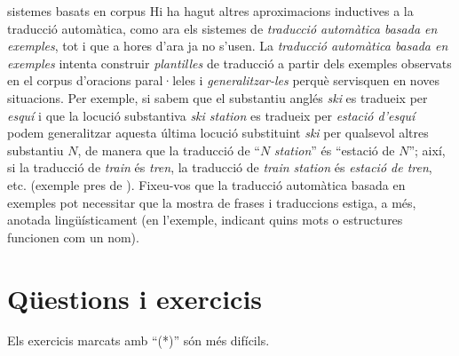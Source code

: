 \begin{persabermes}{sistemes basats en corpus}
  Hi ha hagut altres aproximacions inductives a la traducció
  automàtica, como ara els sistemes de \emph{traducció automàtica
    basada en exemples}, tot i que a hores d'ara ja no s'usen.  La
  \emph{traducció automàtica basada en exemples} intenta construir
  \emph{plantilles} de traducció a partir dels exemples observats en
  el corpus d'oracions paral·leles i \emph{generalitzar-les} perquè
  servisquen en noves situacions. Per exemple, si sabem que el
  substantiu anglés \emph{ski} es tradueix per \emph{esquí} i que la
  locució substantiva \emph{ski station} es tradueix per \emph{estació
    d'esquí} podem generalitzar aquesta última locució substituint
  \emph{ski} per qualsevol altres substantiu $N$, de manera que la
  traducció de ``$N$ \emph{station}'' és ``estació de $N$''; així, si
  la traducció de \emph{train} és \emph{tren}, la traducció de
  \emph{train station} és \emph{estació de tren}, etc. (exemple pres
  de \citealt{carl01j}). Fixeu-vos que la traducció automàtica basada
  en exemples pot necessitar que la mostra de frases i traduccions
  estiga, a més, anotada lingüísticament (en l'exemple, indicant quins
  mots o estructures funcionen com un nom).
\end{persabermes}


\section{Qüestions i exercicis}

Els exercicis marcats amb ``(*)'' són més difícils.

